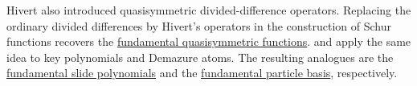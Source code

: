 Hivert also introduced quasisymmetric divided-difference operators.  Replacing
the ordinary divided differences by Hivert's operators in the construction of
Schur functions recovers the \hyperref[gessel]{fundamental quasisymmetric
functions}.   and 
\cite{HicksNiese2024x} apply the same idea to key polynomials and Demazure
atoms.  The resulting analogues are the \hyperref[slideF]{fundamental slide
polynomials} and the \hyperref[fundamentalParticle]{fundamental particle
basis}, respectively.
